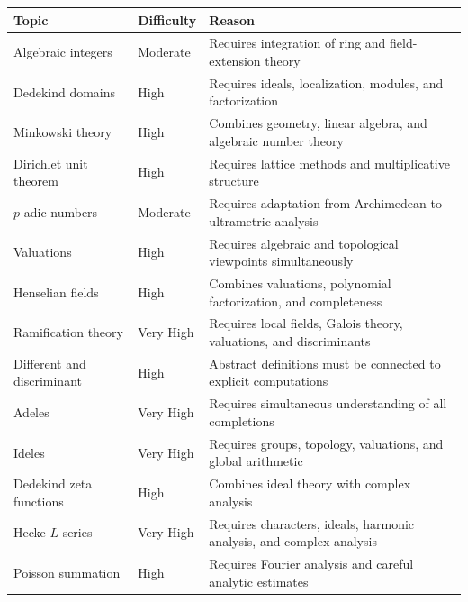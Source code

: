 \documentclass[11pt,a4paper]{article}
\begin{document}
\begin{longtable}{p{}p{}p{}}
\toprule
\textbf{Topic} & \textbf{Difficulty} & \textbf{Reason} \\
\midrule
Algebraic integers & Moderate &
Requires integration of ring and field-extension theory \\

Dedekind domains & High &
Requires ideals, localization, modules, and factorization \\

Minkowski theory & High &
Combines geometry, linear algebra, and algebraic number theory \\

Dirichlet unit theorem & High &
Requires lattice methods and multiplicative structure \\

\(p\)-adic numbers & Moderate &
Requires adaptation from Archimedean to ultrametric analysis \\

Valuations & High &
Requires algebraic and topological viewpoints simultaneously \\

Henselian fields & High &
Combines valuations, polynomial factorization, and completeness \\

Ramification theory & Very High &
Requires local fields, Galois theory, valuations, and discriminants \\

Different and discriminant & High &
Abstract definitions must be connected to explicit computations \\

Adeles & Very High &
Requires simultaneous understanding of all completions \\

Ideles & Very High &
Requires groups, topology, valuations, and global arithmetic \\

Dedekind zeta functions & High &
Combines ideal theory with complex analysis \\

Hecke \(L\)-series & Very High &
Requires characters, ideals, harmonic analysis, and complex analysis \\

Poisson summation & High &
Requires Fourier analysis and careful analytic estimates \\


\end{longtable}
\end{document}
